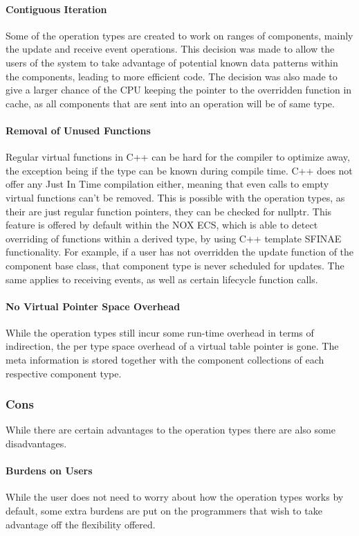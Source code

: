 \paragraph{Contiguous Iteration}
Some of the operation types are created to work on ranges of components, mainly the update and receive event operations.
This decision was made to allow the users of the system to take advantage of potential known data patterns within the components,
leading to more efficient code.
The decision was also made to give a larger chance of the CPU keeping the pointer to the overridden function in cache,
as all components that are sent into an operation will be of same type.

\paragraph{Removal of Unused Functions}
Regular virtual functions in C++ can be hard for the compiler to optimize away, the exception
being if the type can be known during compile time. C++ does not offer any Just In Time compilation either,
meaning that even calls to empty virtual functions can't be removed.
This is possible with the operation types, as their are just regular function pointers, they can be checked for nullptr.
This feature is offered by default within the NOX ECS, which is able to detect overriding of functions within a derived type,
by using C++ template SFINAE functionality. 
For example, if a user has not overridden the update function of the component base class, that component type is never scheduled
for updates. The same applies to receiving events, as well as certain lifecycle function calls.

\paragraph{No Virtual Pointer Space Overhead}
While the operation types still incur some run-time overhead in terms of indirection,
the per type space overhead of a virtual table pointer is gone.
The meta information is stored together with the component collections of each respective component type.

\subsubsection{Cons}
While there are certain advantages to the operation types there are also some disadvantages.

\paragraph{Burdens on Users}
While the user does not need to worry about how the operation types works by default,
some extra burdens are put on the programmers that wish to take advantage off the flexibility offered.

